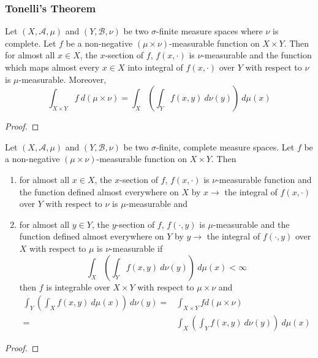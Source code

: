 \subsubsection{Tonelli's Theorem}
\begin{theorem}[Tonelli]
	Let $(X,\mathcal{A},\mu)$ and $(Y,\mathcal{B},\nu)$ be two $\sigma$-finite measure spaces where $\nu$ is complete.
	Let $f$ be a non-negative $(\mu \times \nu)$-measurable function on $X \times Y$.
	Then for almost all $x \in X$, the $x$-section of $f$, $f(x,\cdot)$ is $\nu$-measurable and the function which maps almost every $x \in X$ into integral of $f(x,\cdot)$ over $Y$ with respect to $\nu$ is $\mu$-measurable.
	Moreover,
	\begin{equation}
		\int_{X \times Y} f \ d(\mu \times \nu) = \int_X \left( \int_Y f(x,y) \ d\nu(y) \right) \ d\mu(x)
	\end{equation}
\end{theorem}
\begin{proof}
\end{proof}

\begin{corollary}
	Let $(X,\mathcal{A},\mu)$ and $(Y,\mathcal{B},\nu)$ be two $\sigma$-finite, complete measure spaces.
	Let $f$ be a non-negative $(\mu \times \nu)$-measurable function on $X \times Y$.
	Then
	\begin{enumerate}
		\item for almost all $x \in X$, the $x$-section of $f$, $f(x,\cdot)$ is $\nu$-measurable function and the function defined almost everywhere on $X$ by $x \to $ the integral of $f(x,\cdot)$ over $Y$ with respect to $\nu$ is $\mu$-measurable and
		\item for almost all $y \in Y$, the $y$-section of $f$, $f(\cdot,y)$ is $\mu$-measurable and the function defined almost everywhere on $Y$ by $y \to $ the integral of $f(\cdot,y)$ over $X$ with respect to $\mu$ is $\nu$-measurable if
		\begin{equation}
			\int_X \left( \int_Y f(x,y) \ d\nu(y) \right) \ d\mu(x) < \infty
		\end{equation}
		then $f$ is integrable over $X \times Y$ with respect to $\mu \times \nu$ and
		\begin{align}
			\int_Y \left( \int_X f(x,y) \ d\mu(x) \right) \ d\nu(y) = & \int_{X \times Y} f d(\mu \times \nu) \\
			= & \int_X \left( \int_Y f(x,y) \ d\nu(y) \right) \ d\mu(x) \nonumber
		\end{align}
	\end{enumerate}
\end{corollary}
\begin{proof}
\end{proof}

